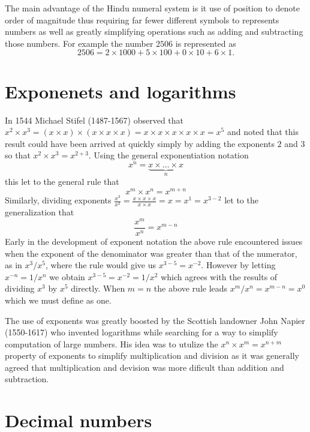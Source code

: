 The main advantage of the Hindu numeral system is it use of position to denote order of magnitude thus requiring far fewer different symbols to represents numbers as well as greatly simplifying operations such as adding and subtracting those numbers. For example the number $2506$ is represented as
\[
2506 = 2 \times 1000 + 5 \times 100 + 0 \times 10 + 6 \times 1.
\]

\section{Exponenets and logarithms}
In 1544 {Michael Stifel} (1487-1567) observed that $x^2 \times x^3 = (x \times x) \times (x \times x \times x) = x \times x \times x \times x \times x = x^5$ and noted that this  result could have been arrived at quickly simply by adding the exponents $2$ and $3$ so that $x^2 \times x^3 = x^{2+3}$. Using the general exponentiation notation
\[
x^n = \underbrace{x \times \dots \times x}_n
\]
this let to the general rule that
\[
x^m \times x^n = x^{m+n}
\]
Similarly, dividing exponents $\frac{x^3}{x^2} = \frac{x \times x \times x}{x \times x} = x = x^1 = x^{3-2}$ let to the generalization that 
\[
\frac{x^m}{x^n} = x^{m-n}
\]
Early in the development of exponent notation the above rule encountered issues when the exponent of the denominator was greater than that of the numerator, as in $x^3/x^5$, where the rule would give us $x^{3-5} = x^{-2}$. However by letting $x^{-n} = 1/x^n$ we obtain $x^{3-5} = x^{-2} = 1/x^2$ which agrees with the results of dividing $x^3$ by $x^5$ directly. When $m = n$ the above rule leads $x^m/x^n = x^{m-n} = x^0$ which we must define as one. 

The use of exponents was greatly boosted by the Scottish landowner {John Napier} (1550-1617) who invented {logarithms} while searching for a way to simplify computation of large numbers. His idea was to utulize the $x^n \times x^m = x^{n+m}$ property of exponents to simplify multiplication and division as it was generally agreed that multiplication and devision was more dificult than addition and subtraction. 


\section{Decimal numbers}

